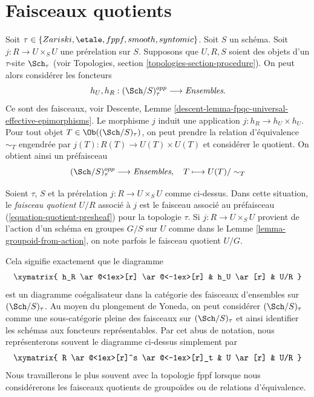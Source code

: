 \section{Faisceaux quotients}
\label{section-quotient-sheaves}

\noindent
Soit $\tau \in\allowbreak \{Zariski,\allowbreak \etale,\allowbreak fppf,\allowbreak smooth,\allowbreak syntomic\}$.
Soit $S$ un schéma.
Soit $j : R \to U \times_S U$ une prérelation sur $S$.
Supposons que $U, R, S$ soient des objets d'un $\tau$-site $\Sch_\tau$
(voir Topologies, section \ref{topologies-section-procedure}).
On peut alors considérer les foncteurs
$$
h_U, h_R :
(\Sch/S)_\tau^{opp}
\longrightarrow
\textit{Ensembles}.
$$
Ce sont des faisceaux, voir
Descente, Lemme \ref{descent-lemma-fpqc-universal-effective-epimorphisms}.
Le morphisme $j$ induit une application $j : h_R \to h_U \times h_U$.
Pour tout objet $T \in \Ob((\Sch/S)_\tau)$,
on peut prendre la relation d'équivalence $\sim_T$ engendrée par
$j(T) : R(T) \to U(T) \times U(T)$ et considérer le quotient.
On obtient ainsi un préfaisceau
\begin{equation}
\label{equation-quotient-presheaf}
(\Sch/S)_\tau^{opp}
\longrightarrow
\textit{Ensembles}, \quad
T \longmapsto U(T)/\sim_T
\end{equation}

\begin{definition}
\label{definition-quotient-sheaf}
Soient $\tau$, $S$ et la prérelation $j : R \to U \times_S U$ comme ci-dessus.
Dans cette situation, le {\it faisceau quotient $U/R$} associé
à $j$ est le faisceau associé au préfaisceau
(\ref{equation-quotient-presheaf}) pour la topologie $\tau$.
Si $j : R \to U \times_S U$ provient de l'action d'un schéma en groupes
$G/S$ sur $U$ comme dans le Lemme \ref{lemma-groupoid-from-action}, on
note parfois le faisceau quotient $U/G$.
\end{definition}

\noindent
Cela signifie exactement que le diagramme
$$
\xymatrix{
h_R \ar@<1ex>[r] \ar@<-1ex>[r] &
h_U \ar[r] &
U/R
}
$$
est un diagramme coégalisateur dans la catégorie des faisceaux d'ensembles
sur $(\Sch/S)_\tau$. Au moyen du plongement de Yoneda, on
peut considérer $(\Sch/S)_\tau$ comme une sous-catégorie pleine des
faisceaux sur $(\Sch/S)_\tau$ et ainsi identifier les schémas
aux foncteurs représentables. Par cet abus de notation,
nous représenterons souvent le diagramme ci-dessus simplement par
$$
\xymatrix{
R \ar@<1ex>[r]^s \ar@<-1ex>[r]_t &
U \ar[r] &
U/R
}
$$
Nous travaillerons le plus souvent avec la topologie fppf lorsque nous considérerons
les faisceaux quotients de groupoïdes ou de relations d'équivalence.

